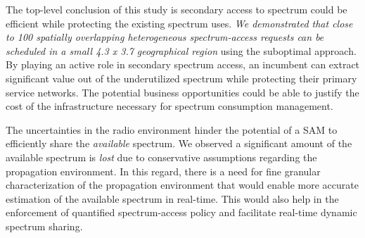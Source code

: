 \documentclass[12pt, draftclsnofoot, onecolumn]{IEEEtran}
\begin{document}
The top-level conclusion of this study is secondary access to spectrum could be efficient while protecting the existing spectrum uses. \textit{We demonstrated that close to 100 spatially overlapping heterogeneous spectrum-access requests can be scheduled in a small 4.3  x 3.7  geographical region} using the suboptimal approach.  By playing an active role in secondary spectrum access, an incumbent can extract significant value out of the underutilized spectrum while protecting their primary service networks. The potential business opportunities could be able to justify the cost of the infrastructure necessary for spectrum consumption management.

The uncertainties in the radio environment hinder the potential of a SAM to efficiently share the \textit{available} spectrum. We observed a significant amount of the available spectrum is \textit{lost} due to conservative assumptions regarding the propagation environment. In this regard, there is a need for fine granular characterization of the propagation environment that would enable more accurate estimation of the available spectrum in real-time. This would also help in the enforcement of quantified spectrum-access policy and facilitate real-time dynamic spectrum sharing.
\end{document}
